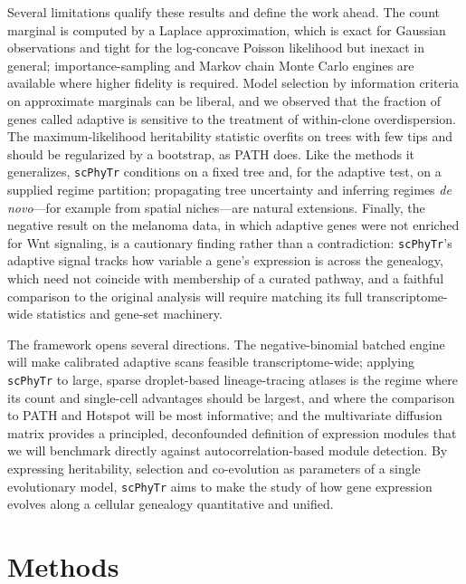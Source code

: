 \documentclass{article}
\newcommand{\scphytr}{\texttt{scPhyTr}}
\begin{document}
Several limitations qualify these results and define the work ahead. The count marginal is
computed by a Laplace approximation, which is exact for Gaussian observations and tight for
the log-concave Poisson likelihood but inexact in general; importance-sampling and Markov
chain Monte Carlo engines are available where higher fidelity is required. Model selection
by information criteria on approximate marginals can be liberal, and we observed that the
fraction of genes called adaptive is sensitive to the treatment of within-clone
overdispersion. The maximum-likelihood heritability statistic overfits on trees with few
tips and should be regularized by a bootstrap, as PATH does. Like the methods it
generalizes, \scphytr{} conditions on a fixed tree and, for the adaptive test, on a
supplied regime partition; propagating tree uncertainty and inferring regimes \emph{de
novo}---for example from spatial niches---are natural extensions. Finally, the negative
result on the melanoma data, in which adaptive genes were not enriched for Wnt signaling,
is a cautionary finding rather than a contradiction: \scphytr{}'s adaptive signal tracks
how variable a gene's expression is across the genealogy, which need not coincide with
membership of a curated pathway, and a faithful comparison to the original analysis will
require matching its full transcriptome-wide statistics and gene-set machinery.

The framework opens several directions. The negative-binomial batched engine will make
calibrated adaptive scans feasible transcriptome-wide; applying \scphytr{} to large,
sparse droplet-based lineage-tracing atlases is the regime where its count and single-cell
advantages should be largest, and where the comparison to PATH and Hotspot will be most
informative; and the multivariate diffusion matrix provides a principled, deconfounded
definition of expression modules that we will benchmark directly against autocorrelation-based
module detection. By expressing heritability, selection and co-evolution as parameters of a
single evolutionary model, \scphytr{} aims to make the study of how gene expression evolves
along a cellular genealogy quantitative and unified.

\section*{Methods}
\label{sec:methods}
\end{document}
